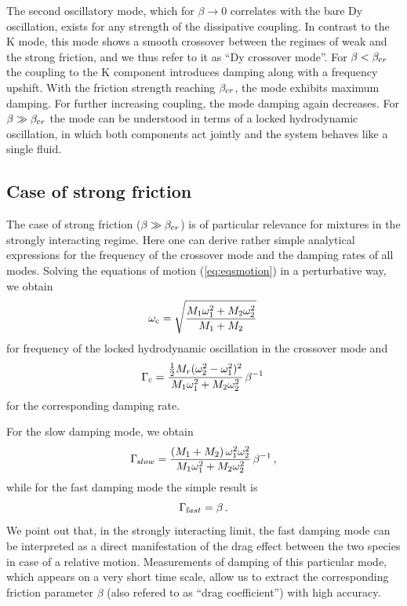 {
The second oscillatory mode, which for $\beta \rightarrow 0$ correlates with the bare Dy oscillation, exists for any strength of the dissipative coupling. In contrast to the K mode, this mode shows a smooth crossover between the regimes of weak and the strong friction, and we thus refer to it as ``Dy crossover mode''. 
For $\beta < \beta_{\textrm cr}$ the coupling to the K component introduces damping along with a frequency upshift. With the friction strength reaching $\beta_{\textrm cr}$, the mode exhibits maximum damping. For further increasing coupling, 
the mode damping again decreases. For $\beta \gg \beta_{\textrm cr}$ the mode can be understood in terms of a locked hydrodynamic oscillation, in which both components act jointly and the system behaves like a single fluid.
}

\subsection{Case of strong friction} 
\label{ssec:strongfriction}

The case of strong friction ($\beta \gg \beta_{\textrm cr}$) is of particular relevance for mixtures in the strongly interacting regime. Here one can derive rather simple analytical expressions for the frequency of the crossover mode and the damping rates of all modes. Solving the equations of motion (\ref{eq:eqsmotion}) in a perturbative way, we obtain
\begin{equation}
\omega_{\textrm c} = \sqrt{   \frac{M_1 \omega_1^2 + M_2 \omega_2^2 }{M_1 + M_2}} \, 
\label{eq:lockedfreq}
\end{equation}
for frequency of the locked hydrodynamic oscillation in the crossover mode and 
\begin{equation}
\Gamma_{\textrm c} =
\frac{\tfrac{1}{2}M_r (\omega_2^2-\omega_1^2)^2}
{M_1 \omega_1^2 + M_2\omega_2^2} \, \beta^{-1} \, 
\end{equation}
for the corresponding damping rate.

For the slow damping mode, we obtain
\begin{equation}
\Gamma_{\textrm slow} =
\frac{(M_1+M_2) \, \omega_1^2 \omega_2^2}
{M_1 \omega_1^2 + M_2\omega_2^2} \, \beta^{-1} \, ,
\label{eq:Gammaslow}
\end{equation}
while for the fast damping mode the simple result is
\begin{equation}
\Gamma_{\textrm fast} =  \beta \, .
\label{eq:Gammafast}
\end{equation}
We point out that, in the strongly interacting limit, the fast damping mode can be interpreted as a direct manifestation of the drag effect between the two species in case of a relative motion.
Measurements of damping of this particular mode, which appears on a very short time scale, allow us to extract the corresponding friction parameter $\beta$ (also refered to as ``drag coefficient'') with high accuracy.


